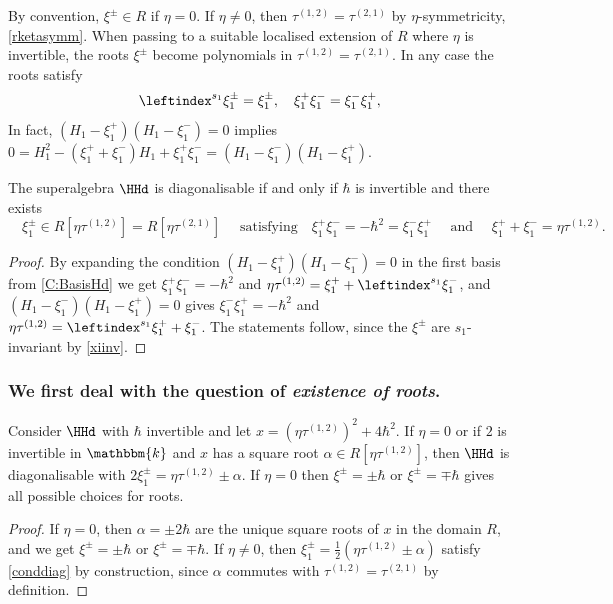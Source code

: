 \documentclass[a4paper,11pt]{amsart}
\numberwithin{equation}{subsection}
\theoremstyle{definition}
\theoremstyle{theorem}
\theoremstyle{remark}
\newcommand\taui[1][i]{\tau^{(#1)}}
\newcommand\kk{\mathbbm{k}}
\begin{document}
  \begin{Remark}\label{xiinv}  By convention, $\xi^\pm\in R$ if $\eta=0$. If $\eta\not=0$, then $\taui[1,2]=\taui[2,1]$ by $\eta$-symmetricity, \autoref{rketasymm}. When passing to a suitable localised extension of $R$ where $\eta$ is invertible, the roots $\xi^\pm$ become polynomials in $\taui[1,2]=\taui[2,1]$. In any case the roots satisfy
  \begin{equation}\label{xxinvformula}
  \leftindex^{s_1}\xi_1^\pm=\xi_1^\pm,\quad\xi_{1}^+\xi_{1}^-=\xi_{1}^-\xi_{1}^+,
  \end{equation}
 In fact, $(H_1-\xi_{1}^+)(H_1-\xi_{1}^-)=0$ implies
  $0=H_1^2-(\xi^+_1+\xi^-_1)H_1+\xi^+_1\xi^-_1=(H_1-\xi_{1}^-)(H_1-\xi_{1}^+)$.
\end{Remark}
  \begin{Lemma}\label{conddiag}The superalgebra $\HHd$ is diagonalisable
  if and only if $\hbar$ is
    invertible and there exists \[\text{$\quad\xi_{1}^\pm\in R[\eta\tau^{(1,2)}]=R[\eta\tau^{(2,1)}]\quad $ satisfying}
  \quad\xi_{1}^+\xi_{1}^-=-\hbar^2=\xi_{1}^-\xi_{1}^+\quad\text{ and }\quad\xi_{1}^++\xi_{1}^-=\eta\taui[1,2].\]
\end{Lemma}
\begin{proof}
By expanding the condition $(H_1-\xi_{1}^+)(H_1-\xi_{1}^-)=0$ in the first basis from \autoref{C:BasisHd} we get $\xi_{1}^+\xi_{1}^-=-\hbar^2$ and $\eta\taui[1,2]=\xi_{1}^++\leftindex^{s_1}\xi_{1}^-$, and $(H_1-\xi_{1}^-)(H_1-\xi_{1}^+)=0$ gives $\xi_{1}^-\xi_{1}^+=-\hbar^2$ and $\eta\taui[1,2]=\leftindex^{s_1}\xi_{1}^++\xi_{1}^-$.
The statements follow, since the $\xi^\pm$ are $s_1$-invariant by \autoref{xiinv}.
\end{proof}
\subsubsection*{We first deal with the question of \emph{existence of roots}.}
\begin{Lemma}\label{L:roots}
    Consider $\HHd$ with  $\hbar$ invertible and let $x= \left(\eta\taui[1,2]\right)^2+4\hbar^2$.  If $\eta=0$ or if  $2$ is invertible in $\kk$ and $x$ has a square root
  $\alpha\in R[\eta\tau^{(1,2)}]$, then  $\HHd$  is diagonalisable with
  $2\xi^\pm_1=\eta\taui[1,2]\pm\alpha$. If $\eta=0$ then $\xi^\pm=\pm\hbar$ or $\xi^\pm=\mp\hbar$ gives all possible choices for roots.
\end{Lemma}
\begin{proof}
If $\eta=0$, then $\alpha=\pm2\hbar$ are the unique square roots of $x$ in the domain $R$,  and we get $\xi^\pm=\pm\hbar$ or $\xi^\pm=\mp\hbar$. If $\eta\not=0$,  then   $\xi^\pm_1=\tfrac12(\eta\taui[1,2]\pm\alpha)$ satisfy \autoref{conddiag} by construction, since $\alpha$ commutes with $\taui[1,2]=\taui[2,1]$ by definition.
\end{proof}
\end{document}
